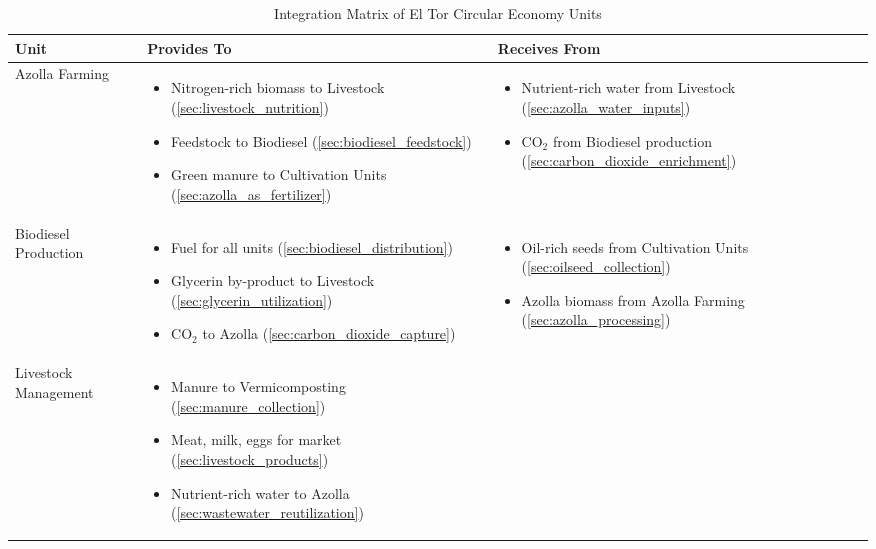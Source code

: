 \begin{table}[h]
\centering
\caption{Integration Matrix of El Tor Circular Economy Units}
\label{tab:integration_matrix}
\begin{tabular}{|p{2.5cm}|p{5cm}|p{5cm}|}
\hline
\textbf{Unit} & \textbf{Provides To} & \textbf{Receives From} \\
\hline
Azolla Farming & 
\begin{itemize}
    \item Nitrogen-rich biomass to Livestock (\ref{sec:livestock_nutrition})
    \item Feedstock to Biodiesel (\ref{sec:biodiesel_feedstock})
    \item Green manure to Cultivation Units (\ref{sec:azolla_as_fertilizer})
\end{itemize} & 
\begin{itemize}
    \item Nutrient-rich water from Livestock (\ref{sec:azolla_water_inputs})
    \item CO$_2$ from Biodiesel production (\ref{sec:carbon_dioxide_enrichment})
\end{itemize} \\
\hline
Biodiesel Production & 
\begin{itemize}
    \item Fuel for all units (\ref{sec:biodiesel_distribution})
    \item Glycerin by-product to Livestock (\ref{sec:glycerin_utilization})
    \item CO$_2$ to Azolla (\ref{sec:carbon_dioxide_capture})
\end{itemize} & 
\begin{itemize}
    \item Oil-rich seeds from Cultivation Units (\ref{sec:oilseed_collection})
    \item Azolla biomass from Azolla Farming (\ref{sec:azolla_processing})
\end{itemize} \\
\hline
Livestock Management & 
\begin{itemize}
    \item Manure to Vermicomposting (\ref{sec:manure_collection})
    \item Meat, milk, eggs for market (\ref{sec:livestock_products})
    \item Nutrient-rich water to Azolla (\ref{sec:wastewater_reutilization})
\end{itemize} & 
\begin{itemize}

\end{itemize}
\end{tabular}
\end{table}
